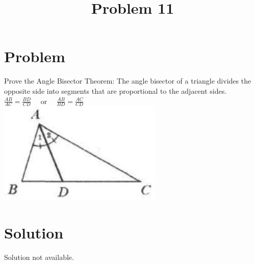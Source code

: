 \documentclass{article}
\title{Problem 11}
\date{}
\begin{document}
\maketitle

\section*{Problem}
Prove the Angle Bisector Theorem: The angle bisector of a triangle divides the opposite side into segments that are proportional to the adjacent sides.\\
\(\frac{A B}{A C}=\frac{B D}{C D} \quad\) or \(\quad \frac{A B}{B D}=\frac{A C}{C D}\)\\
\centering
\includegraphics[width=\textwidth]{images/128(2).jpg}

\section*{Solution}
Solution not available.
\end{document}
